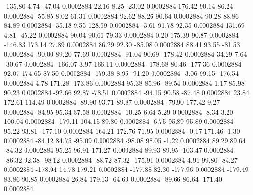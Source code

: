      -135.80        4.74      -47.04     0.0002884
       22.16        8.25      -23.02     0.0002884
      176.42       90.14       86.24     0.0002884
      -55.85        8.02       61.31     0.0002884
       92.62       88.26       90.64     0.0002884
       90.28       88.86       84.89     0.0002884
      -35.18        9.55      128.59     0.0002884
       -3.61       91.78       92.35     0.0002884
      131.69        4.81      -45.22     0.0002884
       90.04       90.66       79.33     0.0002884
        0.20      175.39       90.87     0.0002884
     -146.83      173.14       27.89     0.0002884
       86.29       92.30      -85.08     0.0002884
       88.41       93.55      -81.53     0.0002884
      -90.00       89.20       77.69     0.0002884
      -91.04       90.69     -178.42     0.0002884
       34.29        7.64      -30.67     0.0002884
     -166.07        3.97      166.11     0.0002884
     -178.68       80.46     -177.36     0.0002884
       92.07      174.65       87.50     0.0002884
     -179.38        8.95      -91.20     0.0002884
       -3.06       99.15     -176.54     0.0002884
        4.78      171.28     -173.86     0.0002884
       95.38       85.96      -89.54     0.0002884
        1.17       85.98       90.23     0.0002884
      -92.66       92.87      -78.51     0.0002884
      -94.15       90.58      -87.48     0.0002884
       23.84      172.61      114.49     0.0002884
      -89.90       93.71       89.87     0.0002884
      -79.90      177.42        9.27     0.0002884
      -84.95       95.34       87.58     0.0002884
      -10.25        6.64        5.29     0.0002884
       -8.34        3.20      100.04     0.0002884
     -179.11      104.15       89.80     0.0002884
       -6.75       95.89       95.89     0.0002884
       95.22       93.81     -177.10     0.0002884
      164.21      172.76       71.95     0.0002884
       -0.17      171.46       -1.30     0.0002884
      -84.12       84.75      -95.09     0.0002884
      -98.08       98.05       -1.22     0.0002884
       89.29       89.64      -84.32     0.0002884
       95.25       96.91      171.27     0.0002884
       89.93       89.95     -103.47     0.0002884
      -86.32       92.38      -98.12     0.0002884
      -88.72       87.32     -175.91     0.0002884
        4.91       99.80      -84.27     0.0002884
     -178.94       14.78      179.21     0.0002884
     -177.88       82.30     -177.96     0.0002884
     -179.49       83.86       90.85     0.0002884
       26.84      179.13      -64.69     0.0002884
      -89.66       86.64     -171.40     0.0002884
